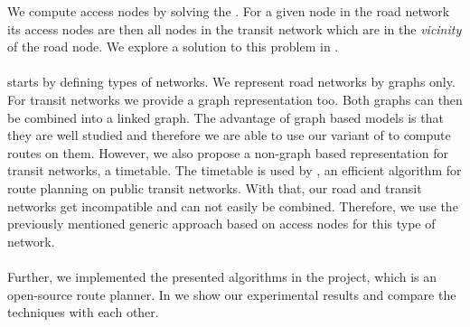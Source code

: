 	We compute access nodes by solving the \nearestNeighborProblem. For a given node in the road network its access
	nodes are then all nodes in the transit network which are in the \textit{vicinity} of the road node. We explore a solution
	to this problem in .\\\\
	 starts by defining types of networks. We represent road networks by graphs only.
	For transit networks we provide a graph representation too. Both graphs can then be combined into a linked graph.
	The advantage of graph based models is that they are well studied and therefore we are able to use our
	\multiModal variant of \dijkstra to compute routes on them.
	However, we also propose a non-graph based representation for transit networks, a timetable. The timetable is used by \csa,
	an efficient algorithm for route planning on public transit networks. With that, our road and transit networks get incompatible
	and can not easily be combined. Therefore, we use the previously mentioned generic approach based on access nodes
	for this type of network.\\\\
	Further, we implemented the presented algorithms in the \cobweb {} project, which is an open-source \multiModal
	route planner. In  we show our experimental results and compare the techniques with each other.